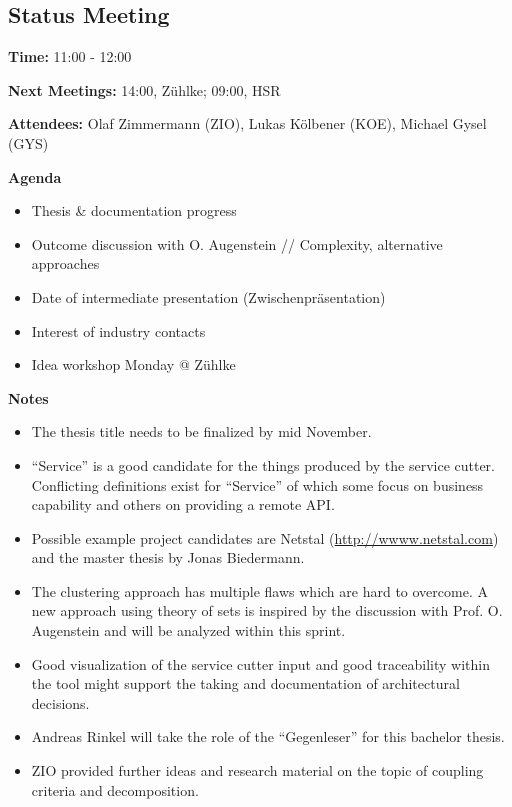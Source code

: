 \subsection{Status Meeting }

\textbf{Time:} 11:00 - 12:00

\textbf{Next Meetings:}  14:00, Z\"uhlke;  09:00, HSR
 
\textbf{Attendees:} Olaf Zimmermann (ZIO), Lukas Kölbener (KOE), Michael Gysel (GYS)

\textbf{Agenda}

\begin{itemize}
\item Thesis \& documentation progress
\item Outcome discussion with O. Augenstein // Complexity, alternative approaches
\item Date of intermediate presentation (Zwischenpr\"asentation)
\item Interest of industry contacts
\item Idea workshop Monday @ Z\"uhlke
\end{itemize}


\textbf{Notes}
\begin{itemize}
\item The thesis title needs to be finalized by mid November.
\item \enquote{Service} is a good candidate for the things produced by the service cutter. Conflicting definitions exist for \enquote{Service} of which some focus on business capability and others on providing a remote API. 
\item Possible example project candidates are Netstal (\url{http://wwww.netstal.com}) and the master thesis by Jonas Biedermann.
\item The clustering approach has multiple flaws which are hard to overcome. A new approach using theory of sets is inspired by the discussion with Prof. O. Augenstein and will be analyzed within this sprint. 
\item Good visualization of the service cutter input and good traceability within the tool might support the taking and documentation of architectural decisions.
\item Andreas Rinkel will take the role of the \enquote{Gegenleser} for this bachelor thesis.
\item ZIO provided further ideas and research material on the topic of coupling criteria and decomposition. 
\end{itemize}
 

